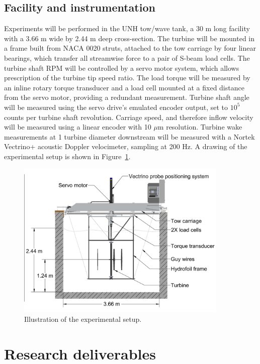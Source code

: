 \documentclass[14pt,letterpaper]{scrreprt}
\begin{document}
\section{Facility and instrumentation}

Experiments will be performed in the UNH tow/wave tank, a 30 m long facility
with a 3.66 m wide by 2.44 m deep cross-section. The turbine will be mounted in
a frame built from NACA 0020 struts, attached to the tow carriage by four linear
bearings, which transfer all streamwise force to a pair of S-beam load cells.
The turbine shaft RPM will be controlled by a servo motor system, which allows
prescription of the turbine tip speed ratio. The load torque will be measured by
an inline rotary torque transducer and a load cell mounted at a fixed distance
from the servo motor, providing a redundant measurement. Turbine shaft angle
will be measured using the servo drive's emulated encoder output, set to $10^5$
counts per turbine shaft revolution. Carriage speed, and therefore inflow
velocity will be measured using a linear encoder with 10 $\mu$m resolution.
Turbine wake measurements at 1 turbine diameter downstream will be measured with
a Nortek Vectrino+ acoustic Doppler velocimeter, sampling at 200 Hz. A drawing
of the experimental setup is shown in Figure~\ref{fig-exp_setup}.

\begin{figure}[ht]
\centering
\includegraphics[clip,trim=0.1in 0 0 0, width=0.9\textwidth]{Figures/tank_cross_section}
\caption{Illustration of the experimental setup.}
\label{fig-exp_setup}
\end{figure}


\chapter{Research deliverables}
\end{document}
